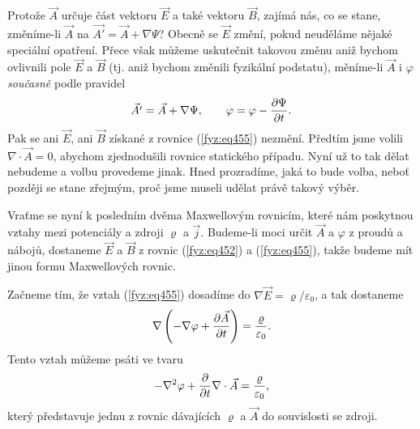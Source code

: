 {  Protože \(\vec{A}\) určuje část vektoru \(\vec{E}\) a také vektoru \(\vec{B}\), zajímá nás, co se 
  stane, změníme-li \(\vec{A}\) na \(\vec{A'} =\vec{A} +\nabla\Psi\)? Obecně se \(\vec{E}\) změní, 
  pokud neuděláme nějaké speciální opatření. Přece však můžeme uskutečnit 
  takovou změnu aniž bychom ovlivnili pole \(\vec{E}\) a \(\vec{B}\) (tj. aniž bychom změnili 
  fyzikální podstatu), měníme-li \(\vec{A}\) i \(\varphi\) \emph{současně} podle pravidel
  \begin{equation}\label{fyz:eq456}
    \vec{A'} =\vec{A} +\nabla\Psi, \qquad \varphi = \varphi - \dfrac{\partial \Psi}{\partial t}.
  \end{equation} 
  Pak se ani \(\vec{E}\), ani \(\vec{B}\) získané z rovnice (\ref{fyz:eq455}) nezmění. Předtím jsme 
  volili \(\nabla\cdot\vec{A} = 0\), abychom zjednodušili rovnice statického případu. Nyní už to 
  tak dělat nebudeme a volbu provedeme jinak. Hned prozradíme, jaká to bude volba, neboť později se 
  stane zřejmým, proč jsme museli udělat právě takový výběr. 
  
  Vraťme se nyní k posledním dvěma Maxwellovým rovnicím, které nám poskytnou vztahy mezi potenciály 
  a zdroji \(\varrho\) a \(\vec{j}\). Budeme-li moci určit \(\vec{A}\) a \(\varphi\) z proudů a 
  nábojů, dostaneme \(\vec{E}\) a \(\vec{B}\) z rovnic (\ref{fyz:eq452}) a (\ref{fyz:eq455}), takže 
  budeme mít jinou formu Maxwellových rovnic. 
  
  Začneme tím, že vztah (\ref{fyz:eq455}) dosadíme do \(\nabla\vec{E} = \varrho/\varepsilon_0\), a 
  tak dostaneme
  \begin{equation}\label{fyz:eq457}
    \nabla\left(-\nabla\varphi + \dfrac{\partial \vec{A}}{\partial t}\right) = \frac{\varrho}{\varepsilon_0}.
  \end{equation}  
  Tento vztah můžeme psáti ve tvaru
  \begin{equation}\label{fyz:eq458}
    -\nabla^2\varphi + \dfrac{\partial  }{\partial t}\nabla\cdot\vec{A} = \frac{\varrho}{\varepsilon_0},
  \end{equation}
  který představuje jednu z rovnic dávajících \(\varrho\) a \(\vec{A}\) do souvislosti se zdroji. 
  
}
